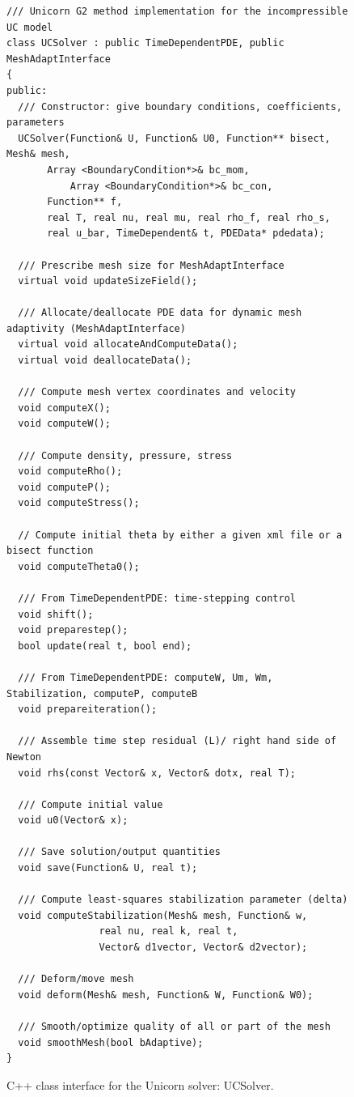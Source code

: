 \begin{figure}[!h]
\begin{lstlisting}
/// Unicorn G2 method implementation for the incompressible UC model
class UCSolver : public TimeDependentPDE, public MeshAdaptInterface
{
public:
  /// Constructor: give boundary conditions, coefficients, parameters
  UCSolver(Function& U, Function& U0, Function** bisect, Mesh& mesh,
	   Array <BoundaryCondition*>& bc_mom,
           Array <BoundaryCondition*>& bc_con,
	   Function** f,
	   real T, real nu, real mu, real rho_f, real rho_s,
	   real u_bar, TimeDependent& t, PDEData* pdedata);

  /// Prescribe mesh size for MeshAdaptInterface
  virtual void updateSizeField();

  /// Allocate/deallocate PDE data for dynamic mesh adaptivity (MeshAdaptInterface)
  virtual void allocateAndComputeData();
  virtual void deallocateData();

  /// Compute mesh vertex coordinates and velocity
  void computeX();
  void computeW();

  /// Compute density, pressure, stress
  void computeRho();
  void computeP();
  void computeStress();

  // Compute initial theta by either a given xml file or a bisect function
  void computeTheta0();

  /// From TimeDependentPDE: time-stepping control
  void shift();
  void preparestep();
  bool update(real t, bool end);

  /// From TimeDependentPDE: computeW, Um, Wm, Stabilization, computeP, computeB
  void prepareiteration();

  /// Assemble time step residual (L)/ right hand side of Newton
  void rhs(const Vector& x, Vector& dotx, real T);

  /// Compute initial value
  void u0(Vector& x);

  /// Save solution/output quantities
  void save(Function& U, real t);

  /// Compute least-squares stabilization parameter (delta)
  void computeStabilization(Mesh& mesh, Function& w,
			    real nu, real k, real t,
			    Vector& d1vector, Vector& d2vector);

  /// Deform/move mesh
  void deform(Mesh& mesh, Function& W, Function& W0);

  /// Smooth/optimize quality of all or part of the mesh
  void smoothMesh(bool bAdaptive);
}

\end{lstlisting}
\caption{
C++ class interface for the Unicorn solver: UCSolver.
}
\label{code:UCSolver}
\end{figure}



